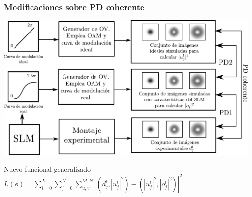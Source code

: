 \documentclass[serif,8pt]{beamer}
\begin{document}
			\begin{frame}
		\frametitle{Modificaciones sobre PD coherente}
			\begin{center}
			\includegraphics[scale=0.6]{img/PD012fulx.pdf}
			
			\begin{block}{\centering Nuevo funcional generalizado}
			\centering
			$ L(\phi) = \sum\limits_{l=0}^L \sum\limits_{j=0}^K \sum\limits_{u,v}^{M,N} |(d_j^l, |u_j^l|^2) - (|u_j^l|^2,|o_j^l|^2)|^2$
			\end{block}
			
	\end{center}
		\end{frame}	
		
\end{document}
